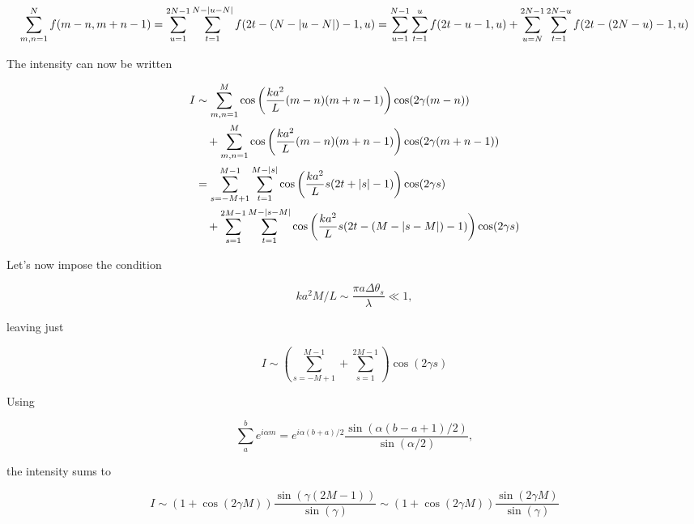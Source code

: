 {\begin{dmath}\label{eqn:modernOptics:problemSet3:3:780}
\sum_{m, n = 1}^N f(m - n, m + n - 1)
=
\sum_{u = 1}^{2 N - 1} \sum_{t = 1}^{N - \Abs{u - N}} f( 2 t - (N - \Abs{u - N}) -1, u)
=
\sum_{u = 1}^{N - 1} \sum_{t = 1}^{u} f( 2 t - u -1, u)
+\sum_{u = N}^{2 N - 1} \sum_{t = 1}^{2 N - u} f( 2 t - (2 N - u) -1, u)
\end{dmath}

The intensity can now be written

\begin{equation}\label{eqn:modernOptics:problemSet3:3:800}
\begin{aligned}
I
&\sim
\sum_{m,n = 1}^{M}
\cos\left(
   \frac{k a^2}{L}
	(m - n) (m + n - 1)
\right)
\cos (2 \gamma (m - n)) \\
&\quad +
\sum_{m,n = 1}^{M}
\cos\left(
   \frac{k a^2}{L}
	(m - n) (m + n - 1)
\right)
\cos (2 \gamma (m + n - 1)) \\
&=
\sum_{s = -M + 1}^{M - 1} \sum_{t = 1}^{M - {\left\lvert{s}\right\rvert}}
\cos\left(
   \frac{k a^2}{L}
	s ( 2 t + {\left\lvert{s}\right\rvert} - 1 )
\right)
\cos (2 \gamma s) \\
&\quad +
\sum_{s = 1}^{2 M - 1} \sum_{t = 1}^{M - {\left\lvert{s - M}\right\rvert}}
\cos\left(
   \frac{k a^2}{L}
	s ( 2 t - (M - {\left\lvert{s - M}\right\rvert}) -1)
\right)
\cos (2 \gamma s)
\end{aligned}
\end{equation}

Let's now impose the condition

\begin{dmath}\label{eqn:modernOptics:problemSet3:3:820}
k a^2 M/L \sim \frac{\pi a \Delta \theta_s }{\lambda} \ll 1,
\end{dmath}

leaving just

\begin{dmath}\label{eqn:modernOptics:problemSet3:3:840}
I \sim
\left( \sum_{s = -M + 1}^{M - 1}
+
\sum_{s = 1}^{2 M - 1} \right)
\cos ( 2 \gamma s)
\end{dmath}

Using

\begin{dmath}\label{eqn:modernOptics:problemSet3:3:860}
\sum_a^b e^{i \alpha m} = e^{i \alpha (b + a)/2} \frac{\sin(\alpha (b - a + 1)/2)}{\sin( \alpha/2)},
\end{dmath}

the intensity sums to

\begin{dmath}\label{eqn:modernOptics:problemSet3:3:880}
I \sim
(1 + \cos( 2 \gamma M ) )
\frac{\sin(\gamma (2 M - 1))}{\sin( \gamma)}
\sim
(1 + \cos( 2 \gamma M ) )
\frac{\sin(2 \gamma M) }{\sin( \gamma )}
\end{dmath}

}
